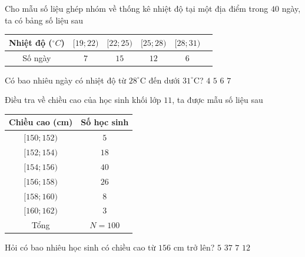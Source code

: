 \begin{ex}%
	Cho mẫu số liệu ghép nhóm về thống kê nhiệt độ tại một địa điểm trong $40$ ngày, ta có bảng số liệu sau 
	\begin{center}
		\begin{tabular}{|c|c|c|c|c|c|}
			 \hline
			Nhiệt độ ($^\circ C$) &  $[19;22)$ & $[22;25)$ & $[25;28)$ & $[28;31)$ \\
			 \hline
			Số ngày & $7$ & $15$ &  $12$ & $6$ \\ \hline
		\end{tabular}
	\end{center}
	Có bao nhiêu ngày có nhiệt  độ từ $28^\circ$C đến dưới $31^\circ$C?
	 \choice
		{$4$} 
		{$5$} 
		{\True  $6$}
		 {$7$}
\end{ex}

\begin{ex}%
	Điều tra về chiều cao của học sinh khối lớp $11$, ta được mẫu số liệu  sau
	\begin{center}
		\begin{tabular}{|c|c|}
			 \hline
			Chiều cao (cm) &  Số học sinh \\
			\hline 
			$[150;152)$ & $5$ \\ 
			 \hline
			$[152;154)$ &  $18$ \\
			 \hline
			$[154;156)$ & $40$  \\
			 \hline
			 $[156;158)$ & $26$ \\
			\hline 
			$[158;160)$ & $8$ \\ 
			\hline 
			$[160;162)$ & $3$ \\ 
			 \hline
			Tổng  & $N=100$ \\
			 \hline
		\end{tabular}
	\end{center}
	Hỏi có bao nhiêu học sinh có  chiều cao từ $156$ cm trở lên?
	 \choice
		{$5$} 
		 {\True $37$}
		{$7$} 
		 {$12$}
\end{ex}

